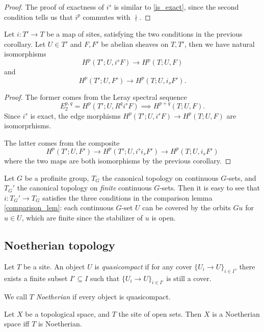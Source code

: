 \documentclass[11pt]{amsart}
\begin{document}
\begin{proof}
    The proof of exactness of $i^s$ is similar to \ref{is_exact}, since the second condition tells us that $i^p$ commutes with $\nmid$.
\end{proof}

\begin{cor}
\label{two_natural_maps}
    Let $i:T'\to T$ be a map of sites, satisfying the two conditions in the previous corollary. Let $U\in T'$ and $F,F'$ be abelian sheaves on $T,T'$, then we have natural isomorphisms
    \[H^p(T';U, i^s F) \to H^p(T;U, F)\]
    and
    \[H^p(T';U, F') \to H^p(T;U, i_sF').\]
\end{cor}

\begin{proof}
    The former comes from the Leray spectral sequence
    \[E_2^{p,q} = H^p(T'; U, R^qi^sF) \implies H^{p+q}(T; U, F).\]
    Since $i^s$ is exact, the edge morphisms $H^p(T'; U, i^sF)\to H^p(T;U,F)$ are isomorprhisms.

    The latter comes from the composite
    \[H^p(T'; U, F') \to H^p(T'; U, i^si_s F') \to H^p(T; U, i_sF')\]
    where the two maps are both isomorphisms by the previous corollary.
\end{proof}

\begin{exm}
    Let $G$ be a profinite group, $T_G$ the canonical topology on continuous $G$-sets, and $T_G'$ the canonical topology on \emph{finite} continuous $G$-sets. Then it is easy to see that $i: T_G'\to T_G$ satisfies the three conditions in the comparison lemma \ref{comparison_lem}: each continuous $G$-set $U$ can be covered by the orbits $Gu$ for $u\in U$, which are finite since the stabilizer of $u$ is open. 
\end{exm}


\subsection{Noetherian topology}

\begin{defn}
    Let $T$ be a site. An object $U$ is \emph{quasicompact} if for any cover $\{U_i\to U\}_{i\in I}$, there exists a finite subset $I'\subseteq I$ such that $\{U_i\to U\}_{i\in I'}$ is still a cover.

    We call $T$ \emph{Noetherian} if every object is quasicompact.
\end{defn}

\begin{exm}
    Let $X$ be a topological space, and $T$ the site of open sets. Then $X$ is a Noetherian space iff $T$ is Noetherian.
\end{exm}
\end{document}
